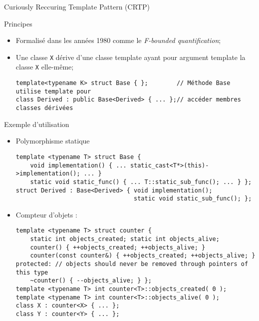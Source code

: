 \documentclass[handout,10pt]{beamer}
\begin{document}
\begin{frame}[fragile]{Curiously Reccuring Template Pattern (CRTP)}
\tiny
\begin{block}{Principes}
\begin{itemize}
\item Formalisé dans les années 1980 comme le \textsl{F-bounded quantification};
\item Une classe \lstinline$X$ dérive d'une classe template ayant pour argument template la classe \lstinline$X$ elle-même;
\begin{lstlisting}
template<typename K> struct Base { };        // Méthode Base utilise template pour 
class Derived : public Base<Derived> { ... };// accéder membres classes dérivées\end{lstlisting}
\end{itemize}
\end{block}
\begin{exampleblock}{Exemple d'utilisation}
\begin{itemize}
\item Polymorphisme statique
\begin{lstlisting}
template <typename T> struct Base { 
    void implementation() { ... static_cast<T*>(this)->implementation(); ... } 
    static void static_func() { ... T::static_sub_func(); ... } }; 
struct Derived : Base<Derived> { void implementation(); 
                                 static void static_sub_func(); };\end{lstlisting}
\item Compteur d'objets :
\begin{lstlisting}
template <typename T> struct counter {
    static int objects_created; static int objects_alive;
    counter() { ++objects_created; ++objects_alive; }
    counter(const counter&) { ++objects_created; ++objects_alive; }
protected: // objects should never be removed through pointers of this type
    ~counter() { --objects_alive; } };
template <typename T> int counter<T>::objects_created( 0 );
template <typename T> int counter<T>::objects_alive( 0 );
class X : counter<X> { ... };
class Y : counter<Y> { ... };
\end{lstlisting}
\end{itemize}
\end{exampleblock}
\end{frame}
\end{document}
